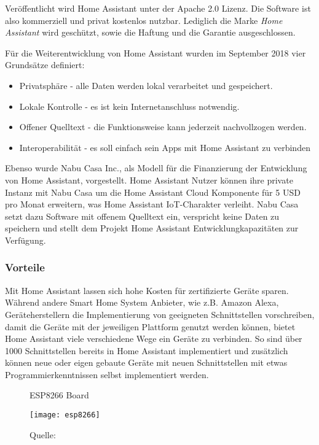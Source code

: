 Veröffentlicht wird Home Assistant unter der Apache 2.0 Lizenz.
Die Software ist also kommerziell und privat kostenlos nutzbar.
Lediglich die Marke \textit{Home Assistant} wird geschützt, sowie die Haftung und die Garantie ausgeschlossen.

Für die Weiterentwicklung von Home Assistant wurden im September 2018 vier Grundsätze definiert:

\begin{itemize}
	\item Privatsphäre - alle Daten werden lokal verarbeitet und gespeichert.
	\item Lokale Kontrolle - es ist kein Internetanschluss notwendig.
	\item Offener Quelltext - die Funktionsweise kann jederzeit nachvollzogen werden.
	\item Interoperabilität - es soll einfach sein Apps mit Home Assistant zu verbinden
\end{itemize}

Ebenso wurde Nabu Casa Inc., als Modell für die Finanzierung der Entwicklung von Home Assistant, vorgestellt.
Home Assistant Nutzer können ihre private Instanz mit Nabu Casa um die Home Assistant Cloud Komponente für 5 USD pro Monat erweitern, was Home Assistant \ac{IoT}-Charakter verleiht.
Nabu Casa setzt dazu Software mit offenem Quelltext ein, verspricht keine Daten zu speichern und stellt dem Projekt Home Assistant Entwicklungkapazitäten zur Verfügung.

\subsubsection{Vorteile}

Mit Home Assistant lassen sich hohe Kosten für zertifizierte Geräte sparen.
Während andere Smart Home System Anbieter, wie z.B. Amazon Alexa, Geräteherstellern die Implementierung von geeigneten Schnittstellen vorschreiben, damit die Geräte mit der jeweiligen Plattform genutzt werden können, bietet Home Assistant viele verschiedene Wege ein Geräte zu verbinden.
So sind über 1000 Schnittstellen bereits in Home Assistant implementiert und zusätzlich können neue oder eigen gebaute Geräte mit neuen Schnittstellen mit etwas Programmierkenntnissen selbst implementiert werden.

\begin{wrapfigure}{r}{0.4\textwidth}
	\centering
	\caption{ESP8266 Board}
	\texttt{[image: esp8266]}
	\caption*{\footnotesize{Quelle: }}
	\label{fig:esp8266}
\end{wrapfigure}

